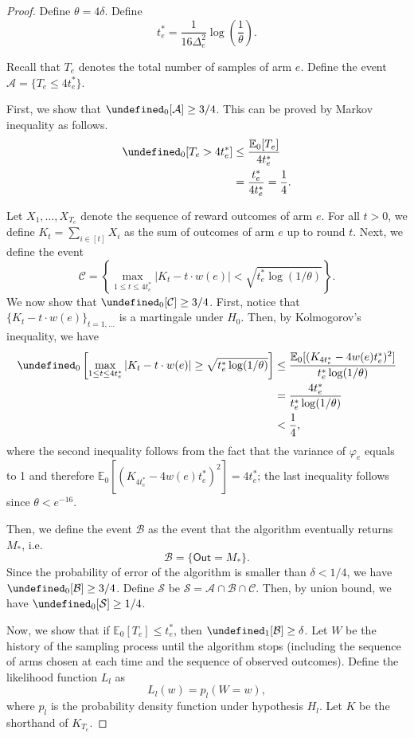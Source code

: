 \documentclass{article}
\newcommand{\Rew}{\varphi}
\newcommand{\E}{\mathbb E}
\newcommand{\out}{\mathsf{Out}}
\let\Pr\undefined
\DeclareMathOperator{\Pr}{Pr}
\begin{document}
\begin{proof}
Define $\theta=4\delta$. Define
\begin{equation}
t_e^* = \frac{1}{16\Delta^2_e}\log\left(\frac{1}{\theta}\right).
\label{eq:define-tstar}
\end{equation}

Recall that $T_e$ denotes the total number of samples of arm $e$.
Define the event
$\mathcal A = \{T_e \le 4t_e^* \}$.

First, we show that $\Pr_0[\mathcal A] \ge 3/4$. 
This can be proved by Markov inequality as follows.
\begin{align*}
\Pr_0[T_e > 4t_e^*] &\le \frac{\E_0[T_e]}{4t_e^*} \\
					  &= \frac{t_e^*}{4t_e^*} = \frac14.
\end{align*}

Let $X_1,\ldots,X_{T_e}$ denote the sequence of reward outcomes of arm $e$.
For all $t>0$, we define $K_t= \sum_{i\in [t]} X_i$ as the sum of outcomes of arm $e$ up to round $t$.
Next, we define the event 
$$
\mathcal C=\left\{\max_{1\le t \le 4t_e^*} \left|K_t-t\cdot w(e)\right|  < \sqrt{t_e^*\log(1/\theta)} \right\}.
$$
We now show that $\Pr_0[\mathcal C] \ge 3/4$.
First, notice that $\{K_t-t\cdot w(e)\}_{t=1,\ldots}$ is a martingale under $H_0$.
Then, by Kolmogorov's inequality, we have
\begin{align*}
\Pr_0\left[\max_{1\le t \le 4t_e^*} \left|K_t-t\cdot w(e)\right| \ge \sqrt{t_e^*\log(1/\theta)} \right]
&\le \frac{\E_0[ (K_{4t_e^*}-4w(e)t_e^*)^2]}{t_e^*\log(1/\theta)}\\
&= \frac{4t_e^*}{t_e^*\log(1/\theta)}\\
&< \frac14,
\end{align*}
where the second inequality follows from the fact that the variance of $\Rew_e$ equals to 1 and therefore $\E_0[(K_{4t_e^*}-4w(e)t_e^*)^2] = 4t_e^*$; the last inequality follows 
since $\theta < e^{-16}$.

Then, we define the event $\mathcal B$ as the event that the algorithm eventually returns $M_*$, i.e.
$$
\mathcal B=\{\out=M_*\}.
$$
Since the probability of error of the algorithm is smaller than $\delta < 1/4$, we have $\Pr_0[\mathcal B] \ge 3/4$.
Define $\mathcal S$ be $\mathcal S=\mathcal A\cap \mathcal B \cap \mathcal C$. 
Then, by union bound, we have $\Pr_0[\mathcal S]\ge 1/4$.

Now, we show that if $\E_0[T_e] \le t_e^*$, then $\Pr_1[\mathcal B] \ge \delta$.
Let $W$ be the history of the sampling process until the algorithm stops (including the sequence of arms chosen at each time and the sequence of observed outcomes).
Define the likelihood function $L_l$ as 
$$
L_l(w) = p_l(W=w),
$$
where $p_l$ is the probability density function under hypothesis $H_l$.
Let $K$ be the shorthand of $K_{T_e}$.


\end{proof}
\end{document}
